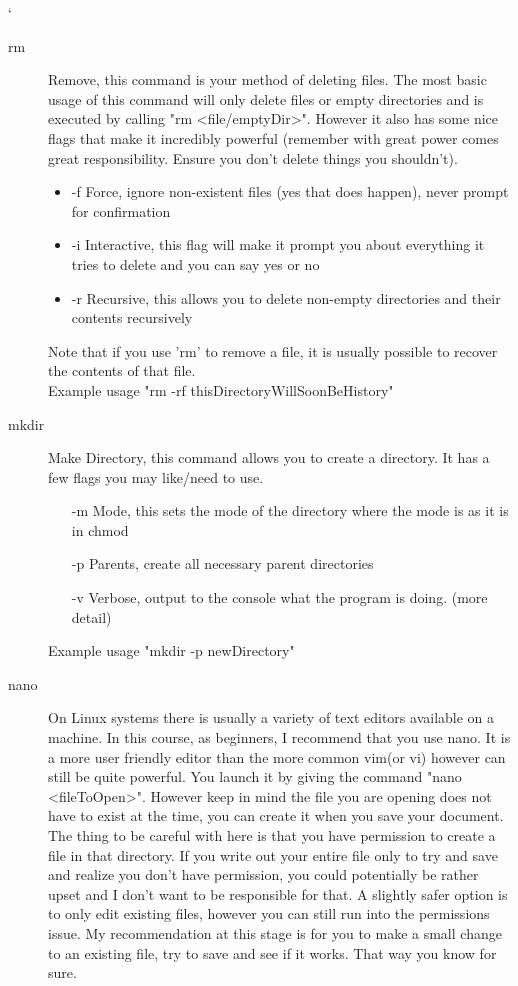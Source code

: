 `\documentclass[a4paper,11pt]{report}
\begin{document}
\begin{description}
				\item[rm]
					Remove, this command is your method of deleting files.
					The most basic usage of this command will only delete files or empty directories and is executed by calling "rm <file/emptyDir>".
					However it also has some nice flags that make it incredibly powerful (remember with great power comes great responsibility. Ensure you don't delete things you shouldn't).
					\begin{itemize}
						\item{-f}
							Force, ignore non-existent files (yes that does happen), never prompt for confirmation
						\item{-i}
							Interactive, this flag will make it prompt you about everything it tries to delete and you can say yes or no
						\item{-r}
							Recursive, this allows you to delete non-empty directories and their contents recursively
					\end{itemize}

					Note that if you use 'rm' to remove a file, it is usually possible to recover the contents of that file.\\

					Example usage "rm -rf thisDirectoryWillSoonBeHistory"

					\item [mkdir]
					Make Directory, this command allows you to create a directory. It has a few flags you may like/need to use.
					\begin{itemize}
						\item[-m] Mode, this sets the mode of the directory where the mode is as it is in chmod
						\item[-p] Parents, create all necessary parent directories
						\item[-v] Verbose, output to the console what the program is doing. (more detail)
					\end{itemize}

					Example usage "mkdir -p newDirectory"

				\item[nano]
					On Linux systems there is usually a variety of text editors available on a machine.
					In this course, as beginners, I recommend that you use nano.
					It is a more user friendly editor than the more common vim(or vi) however can still be quite powerful.
					You launch it by giving the command "nano <fileToOpen>".
					However keep in mind the file you are opening does not have to exist at the time, you can create it when you save your document.
					The thing to be careful with here is that you have permission to create a file in that directory.
					If you write out your entire file only to try and save and realize you don't have permission, you could potentially be rather upset and I don't want to be responsible for that.
					A slightly safer option is to only edit existing files, however you can still run into the permissions issue.
					My recommendation at this stage is for you to make a small change to an existing file, try to save and see if it works.
					That way you know for sure.


\end{description}
\end{document}
